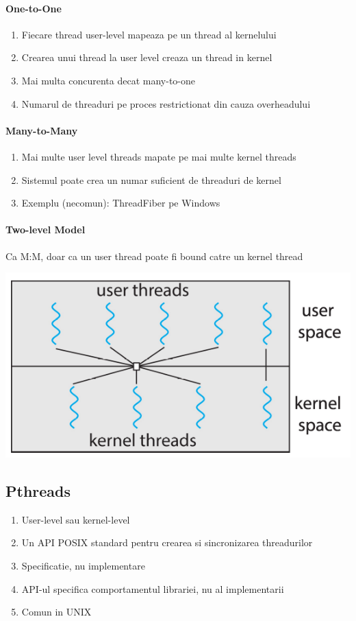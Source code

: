 \documentclass{article}
\begin{document}
\paragraph*{One-to-One}
\begin{enumerate}
    \item Fiecare thread user-level mapeaza pe un thread al kernelului
    \item Crearea unui thread la user level creaza un thread in kernel
    \item Mai multa concurenta decat many-to-one
    \item Numarul de threaduri pe proces restrictionat din cauza overheadului
\end{enumerate}
\paragraph*{Many-to-Many}
\begin{enumerate}
    \item Mai multe user level threads mapate pe mai multe kernel threads
    \item Sistemul poate crea un numar suficient de threaduri de kernel
    \item Exemplu (necomun): ThreadFiber pe Windows
\end{enumerate}
\paragraph*{Two-level Model} Ca M:M, doar ca un user thread poate fi bound catre un kernel thread

\begin{center}
    \includegraphics[scale=0.3]{8_twolevelmodel.png}
\end{center}

\subsection*{Pthreads}
\begin{enumerate}
    \item User-level sau kernel-level
    \item Un API POSIX standard pentru crearea si sincronizarea threadurilor
    \item Specificatie, nu implementare
    \item API-ul specifica comportamentul librariei, nu al implementarii
    \item Comun in UNIX
\end{enumerate}
\end{document}
